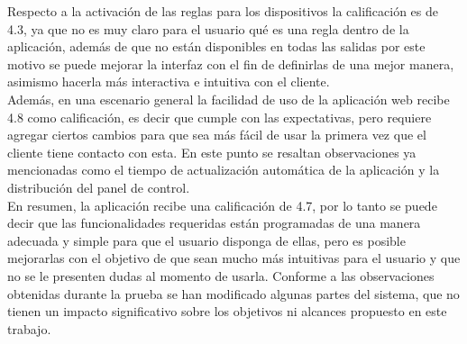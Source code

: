 Respecto a la activación de las reglas para los dispositivos la calificación es de 4.3, ya que no es muy claro para el usuario qué es una regla dentro de la aplicación, además de que no están disponibles en todas las salidas por este motivo se puede mejorar la interfaz con el fin de definirlas de una mejor manera, asimismo hacerla más interactiva e intuitiva con el cliente.\\

Además, en una escenario general la facilidad de uso de la aplicación web recibe 4.8 como calificación, es decir que cumple con las expectativas, pero requiere agregar ciertos cambios para que sea más fácil de usar la primera vez que el cliente tiene contacto con esta. En este punto se resaltan observaciones ya mencionadas como el tiempo de actualización automática de la aplicación y la distribución del panel de control.\\ 

En resumen, la aplicación recibe una calificación de 4.7, por lo tanto se puede decir que las funcionalidades requeridas están programadas de una manera adecuada y simple para que el usuario disponga de ellas, pero es posible mejorarlas con el objetivo de que sean mucho más intuitivas para el usuario y que no se le presenten dudas al momento de usarla. Conforme a las observaciones obtenidas durante la prueba se han modificado algunas partes del sistema, que no tienen un impacto significativo sobre los objetivos ni alcances propuesto en este trabajo.\\